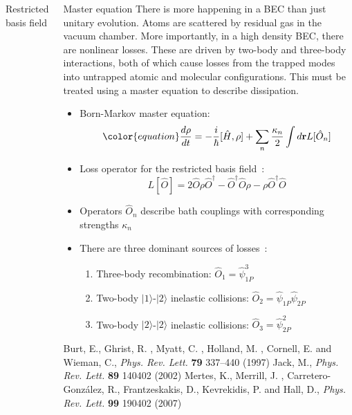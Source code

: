 \documentclass[final,hyperref={pdfpagelabels=false}]{beamer}
\begin{document}
\begin{frame}
\begin{columns}
{\begin{block}{Restricted basis field}
\end{block}

\begin{block}{Master equation}
{\color{textblock}
There is more happening in a BEC than just unitary evolution.
Atoms are scattered by residual gas in the vacuum chamber.
More importantly, in a high density BEC, there are nonlinear losses.
These are driven by two-body and three-body interactions,
both of which cause losses from the trapped modes into untrapped atomic and molecular configurations.
This must be treated using a master equation to describe dissipation.}

\begin{itemize}
	\item Born-Markov master equation:
	\[\color{equation}
		\frac{d\rho}{d t} = - \frac{i}{\hbar} [\hat{H}, \rho] +
		\sum\limits_n \frac{\kappa_n}{2} \int\limits d\mathbf{r} L [\hat{O}_n]
	\]
	\item Loss operator for the restricted basis field~\cite{jack}:
		\[ L [\hat{O}] = 2  \hat{O} \rho \hat{O}^\dagger - \hat{O}^\dagger \hat{O} \rho - \rho \hat{O}^\dagger \hat{O} \]
	\item Operators $\hat{O}_n$ describe bath couplings with corresponding strengths $\kappa_n$
	\item There are three dominant sources of losses~\cite{burt, mertes}:
	\begin{enumerate}
		\item Three-body recombination: $\hat{O}_1 = \hat{\psi}_{1P}^3$
		\item Two-body $\vert1\rangle$-$\vert2\rangle$ inelastic collisions: $\hat{O}_2 = \hat{\psi}_{1P} \hat{\psi}_{2P}$
		\item Two-body $\vert2\rangle$-$\vert2\rangle$ inelastic collisions: $\hat{O}_3 = \hat{\psi}_{2P}^2$
	\end{enumerate}
\end{itemize}

\tiny{ \begin{thebibliography}{9}
	 Burt, E., Ghrist, R. , Myatt, C. , Holland, M. , Cornell, E. and Wieman, C.,
		\textit{Phys. Rev. Lett.} \textbf{79} 337--440 (1997)
	 Jack, M., \textit{Phys. Rev. Lett.} \textbf{89} 140402 (2002)
	 Mertes, K., Merrill, J. ,  Carretero-Gonz\'alez, R.,  Frantzeskakis, D.,  Kevrekidis, P. and Hall, D.,
		\textit{Phys. Rev. Lett.} \textbf{99} 190402 (2007)
\end{thebibliography} }


\end{block}}
\end{columns}
\end{frame}
\end{document}
